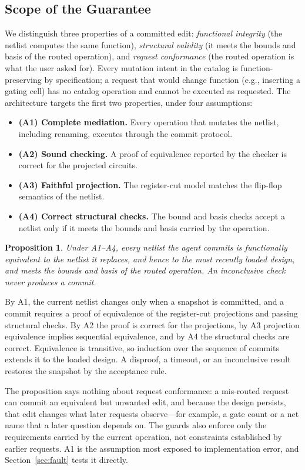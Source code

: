\documentclass[conference,letterpaper]{IEEEtran}
\newtheorem{proposition}{Proposition}
\begin{document}
\subsection{Scope of the Guarantee}
\label{sec:scope}

We distinguish three properties of a committed edit: \emph{functional
integrity} (the netlist computes the same function), \emph{structural
validity} (it meets the bounds and basis of the routed operation), and
\emph{request conformance} (the routed operation is what the user asked for).
Every mutation intent in the catalog is function-preserving by specification;
a request that would change function (e.g., inserting a gating cell) has no
catalog operation and cannot be executed as requested. The architecture targets
the first two properties, under four assumptions:
\begin{itemize}
\item \textbf{(A1) Complete mediation.} Every operation that mutates the
  netlist, including renaming, executes through the commit protocol.
\item \textbf{(A2) Sound checking.} A proof of equivalence reported by the
  checker is correct for the projected circuits.
\item \textbf{(A3) Faithful projection.} The register-cut model matches the
  flip-flop semantics of the netlist.
\item \textbf{(A4) Correct structural checks.} The bound and basis checks accept
  a netlist only if it meets the bounds and basis carried by the operation.
\end{itemize}

\begin{proposition}
Under A1--A4, every netlist the agent commits is functionally equivalent to the
netlist it replaces, and hence to the most recently loaded design, and meets
the bounds and basis of the routed operation. An inconclusive check never
produces a commit.
\end{proposition}
\begin{IEEEproof}
By A1, the current netlist changes only when a snapshot is committed, and a
commit requires a proof of equivalence of the register-cut projections and
passing structural checks. By A2 the proof is correct for the projections, by
A3 projection equivalence implies sequential equivalence, and by A4 the
structural checks are correct. Equivalence is transitive, so induction over the
sequence of commits extends it to the loaded design. A disproof, a timeout, or
an inconclusive result restores the snapshot by the acceptance rule.
\end{IEEEproof}
The proposition says nothing about request conformance: a mis-routed request can commit an equivalent
but unwanted edit, and because the design persists, that edit changes what
later requests observe---for example, a gate count or a net name that a later
question depends on. The guards also enforce only the requirements carried by
the current operation, not constraints established by earlier requests. A1 is
the assumption most exposed to implementation error, and
Section~\ref{sec:fault} tests it directly.
\end{document}
